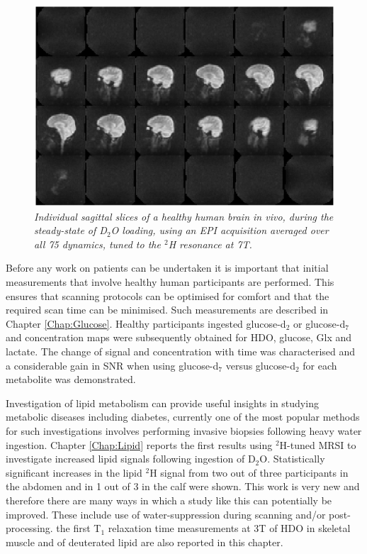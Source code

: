 \begin{figure}[H]
    \centering
    \includegraphics[width=1\textwidth]{Figures/D2O/EPI_avg.png}
    \caption{\textit{Individual sagittal slices of a healthy human brain in vivo, during the steady-state of D$_2$O loading, using an \ac{EPI} acquisition averaged over all 75 dynamics, tuned to the $^2$H resonance at 7T.}}
    \label{fig:Conc:EPI_avg}
\end{figure}

Before any work on patients can be undertaken it is important that initial measurements that involve healthy human participants are performed. This ensures that scanning protocols can be optimised for comfort and that the required scan time can be minimised. Such measurements are described in Chapter \ref{Chap:Glucose}. Healthy participants ingested glucose-d$_2$ or glucose-d$_7$ and concentration maps were subsequently obtained for \ac{HDO}, glucose, Glx and lactate. The change of signal and concentration with time was characterised and a considerable gain in \ac{SNR} when using glucose-d$_7$ versus glucose-d$_2$ for each metabolite was demonstrated.

Investigation of lipid metabolism can provide useful insights in studying metabolic diseases including diabetes, currently one of the most popular methods for such investigations involves performing invasive biopsies following heavy water ingestion. Chapter \ref{Chap:Lipid} reports the first results using $^2$H-tuned MRSI to investigate increased lipid signals following ingestion of D$_2$O. Statistically significant increases in the lipid $^2$H signal from two out of three participants in the abdomen and in 1 out of 3 in the calf were shown. This work is very new and therefore there are many ways in which a study like this can potentially be improved. These include use of water-suppression during scanning and/or post-processing. the first T$_1$ relaxation time measurements at 3T of \ac{HDO} in skeletal muscle and of deuterated lipid are also reported in this chapter.

